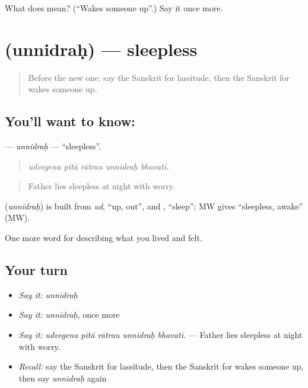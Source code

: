 \begin{tcolorbox}[breakable,colback=teal!4,colframe=teal!35!black,title={Before you move on}]
What does  mean? (\textquotedblleft{}Wakes someone up\textquotedblright{}.) Say it once more.
\end{tcolorbox}
\section[\texorpdfstring{\sk{उन्निद्रः} (unnidraḥ)}{उन्निद्रः (unnidraḥ)}]{ (unnidraḥ) — sleepless}

\label{lesson:SA-C488-unnidrah}



\begin{quote}
Before the new one: say the Sanskrit for lassitude, then the Sanskrit for wakes someone up.
\end{quote}

\subsection*{You'll want to know: }
\textbf{} — \emph{unnidraḥ} — \textquotedblleft{}sleepless\textquotedblright{}.

\begin{quote}
    
\end{quote}

\begin{quote}
\emph{udvegena pitā rātrau unnidraḥ bhavati.}
\end{quote}

\begin{quote}
Father lies sleepless at night with worry.
\end{quote}

\begin{cousinweb}
\textbf{} (\emph{unnidraḥ}) is built from \emph{ud}, \textquotedblleft{}up, out\textquotedblright{}, and \textbf{}, \textquotedblleft{}sleep\textquotedblright{}; MW gives \textquotedblleft{}sleepless, awake\textquotedblright{} (MW).
\end{cousinweb}

\begin{grammarlens}[title={What you've built}]
One more word for describing what you lived and felt.
\end{grammarlens}

\subsection*{Your turn}
\begin{itemize}
\raggedright
  \item \emph{Say it:} \emph{unnidraḥ}
  \item \emph{Say it:} \emph{unnidraḥ}, once more
  \item \emph{Say it:} \emph{udvegena pitā rātrau unnidraḥ bhavati.} — Father lies sleepless at night with worry.
  \item \emph{Recall:} say the Sanskrit for lassitude, then the Sanskrit for wakes someone up, then say \emph{unnidraḥ} again
\end{itemize}

